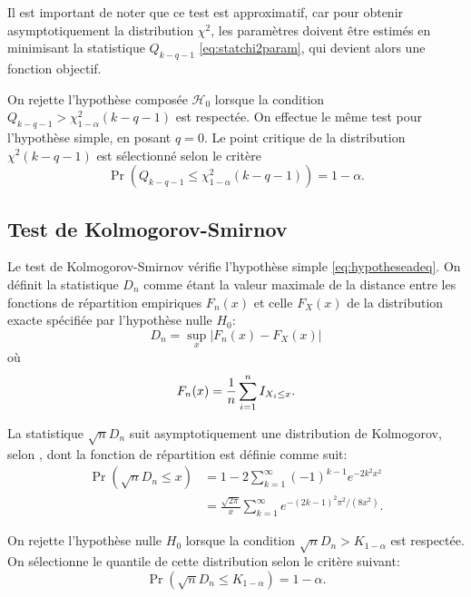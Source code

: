 Il est important de noter que ce test est approximatif, car pour
obtenir asymptotiquement la distribution $\chi^2$, les paramètres
doivent être estimés en minimisant la statistique $Q_{k-q-1}$
\eqref{eq:statchi2param}, qui devient alors une fonction objectif.

On rejette l'hypothèse composée $\mathcal{H}_0$ lorsque la condition
$Q_{k-q-1} > \chi^2_{1-\alpha}(k-q-1)$ est respectée. On effectue le
même test pour l'hypothèse simple, en posant $q=0$. Le point critique
de la distribution $\chi^2(k-q-1)$ est sélectionné selon le critère
\begin{equation}
  \label{eq:quantilechisq}
  \operatorname{Pr}\left(Q_{k-q-1}\leq \chi^2_{1-\alpha}(k-q-1)\right)=1-\alpha.
\end{equation}

\subsection{Test de Kolmogorov-Smirnov}
\label{sec:kolmogorovsmirnov}

Le test de Kolmogorov-Smirnov vérifie l'hypothèse simple
\eqref{eq:hypotheseadeq}. On définit la statistique $D_n$ comme étant
la valeur maximale de la distance entre les fonctions de répartition
empiriques $F_n(x)$ et celle $F_X(x)$ de la distribution exacte
spécifiée par l'hypothèse nulle $H_0$:
\begin{equation}
  \label{eq:statks}
  D_n=\sup_x |F_n(x)-F_X(x)|
\end{equation}
où
\begin{equation}
  \label{eq:repartemp}
  F_n(x)={1 \over n}\sum_{i=1}^n I_{X_i\leq x}.
\end{equation}

La statistique $\sqrt{n}D_n$ suit asymptotiquement une distribution de
Kolmogorov, selon \cite{wang2003evaluating}, dont la fonction de
répartition est définie comme suit:
\begin{align}
  \label{eq:repartkolmogorov}
  \operatorname{Pr}(\sqrt{n}D_n\leq x)&=1-2\sum_{k=1}^\infty (-1)^{k-1} e^{-2k^2 x^2}\\
  &=\frac{\sqrt{2\pi}}{x}\sum_{k=1}^\infty e^{-(2k-1)^2\pi^2/(8x^2)}.
\end{align}

On rejette l'hypothèse nulle $H_0$ lorsque la condition
$\sqrt{n}D_n>K_{1-\alpha}$ est respectée. On sélectionne le quantile
de cette distribution selon le critère suivant:
\begin{equation}
  \label{eq:quantilekolmogorov}
  \operatorname{Pr}(\sqrt{n}D_n \leq K_{1-\alpha})=1-\alpha.
\end{equation}

